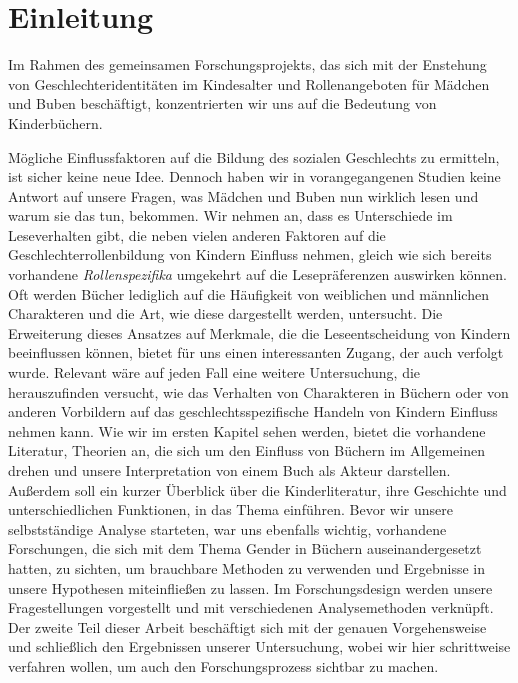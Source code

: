 \onehalfspace

\chapter{Einleitung}

Im Rahmen des gemeinsamen Forschungsprojekts, das sich mit der Enstehung
von Geschlechteridentitäten im Kindesalter und Rollenangeboten für
Mädchen und Buben beschäftigt, konzentrierten wir uns auf die Bedeutung
von Kinderbüchern.

Mögliche Einflussfaktoren auf die Bildung des sozialen Geschlechts zu
ermitteln, ist sicher keine neue Idee. Dennoch haben wir in
vorangegangenen Studien keine Antwort auf unsere Fragen, was Mädchen und
Buben nun wirklich lesen und warum sie das tun, bekommen. Wir nehmen an,
dass es Unterschiede im Leseverhalten gibt, die neben vielen anderen
Faktoren auf die Geschlechterrollenbildung von Kindern Einfluss nehmen,
gleich wie sich bereits vorhandene \emph{Rollenspezifika} umgekehrt auf
die Lesepräferenzen auswirken können. Oft werden Bücher lediglich auf
die Häufigkeit von weiblichen und männlichen Charakteren und die Art,
wie diese dargestellt werden, untersucht. Die Erweiterung dieses
Ansatzes auf Merkmale, die die Leseentscheidung von Kindern beeinflussen
können, bietet für uns einen interessanten Zugang, der auch verfolgt
wurde. Relevant wäre auf jeden Fall eine weitere Untersuchung, die
herauszufinden versucht, wie das Verhalten von Charakteren in Büchern
oder von anderen Vorbildern auf das geschlechtsspezifische Handeln von
Kindern Einfluss nehmen kann. Wie wir im ersten Kapitel sehen werden,
bietet die vorhandene Literatur, Theorien an, die sich um den Einfluss
von Büchern im Allgemeinen drehen und unsere Interpretation von einem
Buch als Akteur darstellen. Außerdem soll ein kurzer Überblick über die
Kinderliteratur, ihre Geschichte und unterschiedlichen Funktionen, in
das Thema einführen. Bevor wir unsere selbstständige Analyse starteten,
war uns ebenfalls wichtig, vorhandene Forschungen, die sich mit dem
Thema Gender in Büchern auseinandergesetzt hatten, zu sichten, um
brauchbare Methoden zu verwenden und Ergebnisse in unsere Hypothesen
miteinfließen zu lassen. Im Forschungsdesign werden unsere
Fragestellungen vorgestellt und mit verschiedenen Analysemethoden
verknüpft. Der zweite Teil dieser Arbeit beschäftigt sich mit der
genauen Vorgehensweise und schließlich den Ergebnissen unserer
Untersuchung, wobei wir hier schrittweise verfahren wollen, um auch den
Forschungsprozess sichtbar zu machen.
